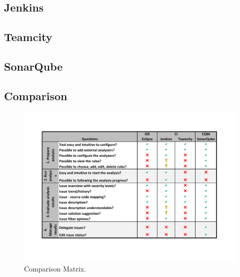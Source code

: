 \documentclass[conference]{IEEEtran}
\begin{document}
\subsection{Jenkins}
\label{subsec:evaluation_jenkins}

\subsection{Teamcity}
\label{subsec:evaluation_teamcity}

\subsection{SonarQube}
\label{subsec:evaluation_sonarqube}


\subsection{Comparison}
\label{subsec:comparation}

\begin{figure}[n]
	\includegraphics[angle=90]{img/comparation}
	\caption{Comparison Matrix.}
	\label{fig:comparison_matrix}
\end{figure}

\end{document}
